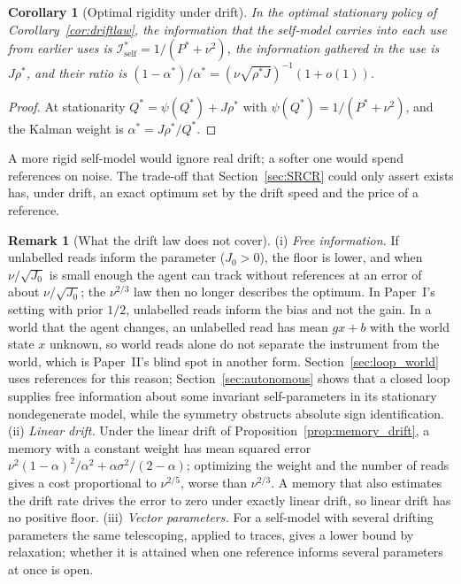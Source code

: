\documentclass[12pt]{article}
\newtheorem{corollary}[theorem]{Corollary}
\theoremstyle{definition}
\newtheorem{remark}[theorem]{Remark}
\begin{document}
\begin{corollary}[Optimal rigidity under drift]
\label{cor:rigidity}
In the optimal stationary policy of Corollary~\ref{cor:driftlaw}, the information that the self-model carries into each use from earlier uses is $\mathcal I_{\mathrm{self}}^*=1/(P^*+\nu^2)$, the information gathered in the use is $J\rho^*$, and their ratio is $(1-\alpha^*)/\alpha^*=(\nu\sqrt{\rho^*J})^{-1}(1+o(1))$.
\end{corollary}

\begin{proof}
At stationarity $Q^*=\psi(Q^*)+J\rho^*$ with $\psi(Q^*)=1/(P^*+\nu^2)$, and the Kalman weight is $\alpha^*=J\rho^*/Q^*$.
\end{proof}

A more rigid self-model would ignore real drift; a softer one would spend references on noise. The trade-off that Section~\ref{sec:SRCR} could only assert exists has, under drift, an exact optimum set by the drift speed and the price of a reference.

\begin{remark}[What the drift law does not cover]
\label{rem:driftlaw_scope}
(i) \emph{Free information.} If unlabelled reads inform the parameter ($J_0>0$), the floor is lower, and when $\nu/\sqrt{J_0}$ is small enough the agent can track without references at an error of about $\nu/\sqrt{J_0}$; the $\nu^{2/3}$ law then no longer describes the optimum. In Paper~I's setting with prior $1/2$, unlabelled reads inform the bias and not the gain. In a world that the agent changes, an unlabelled read has mean $gx+b$ with the world state $x$ unknown, so world reads alone do not separate the instrument from the world, which is Paper~II's blind spot in another form. Section~\ref{sec:loop_world} uses references for this reason; Section~\ref{sec:autonomous} shows that a closed loop supplies free information about some invariant self-parameters in its stationary nondegenerate model, while the symmetry obstructs absolute sign identification.
(ii) \emph{Linear drift.} Under the linear drift of Proposition~\ref{prop:memory_drift}, a memory with a constant weight has mean squared error $\nu^2(1-\alpha)^2/\alpha^2+\alpha\sigma^2/(2-\alpha)$; optimizing the weight and the number of reads gives a cost proportional to $\nu^{2/5}$, worse than $\nu^{2/3}$. A memory that also estimates the drift rate drives the error to zero under exactly linear drift, so linear drift has no positive floor.
(iii) \emph{Vector parameters.} For a self-model with several drifting parameters the same telescoping, applied to traces, gives a lower bound by relaxation; whether it is attained when one reference informs several parameters at once is open.
\end{remark}
\end{document}
